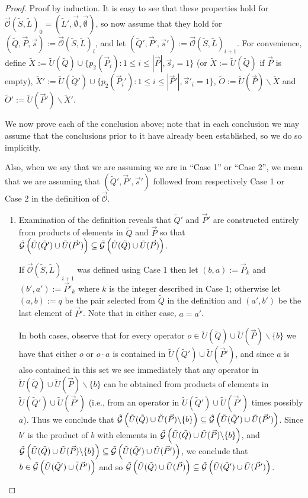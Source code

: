 \documentclass[twocolumn,showpacs,preprintnumbers,amsmath,amssymb,nofootinbib,pra,floatfix]{revtex4-1}
\newcommand{\lst}{\vec}
\newcommand{\set}{\tilde}
\newcommand{\genfun}{\tilde{\mathcal{G}}}
\newcommand{\unpack}{\set U}
\newcommand{\optimizer}{\lst{\mathcal{O}}}
\begin{document}
\begin{proof}
Proof by induction.  It is easy to see that these properties hold for $\optimizer(\set S,\set L)_0=(\set L',\lst\emptyset,\lst\emptyset)$, so now assume that they hold for $(\set Q,\lst P,\lst s):=\optimizer(\set S,\set L)_i$, and let $(\set Q',\lst P',\lst s'):=\optimizer(\set S,\set L)_{i+1}$.  For convenience, define $\set X:=\unpack(\set Q)\cup\{p_2(\lst P_i):1 \le i \le |\lst P|, \lst s_i=1\}$ (or $\set X:=\unpack(\set Q)$ if $\lst P$ is empty), $\set X':=\unpack(\set Q')\cup\{p_2(\lst P_i'):1 \le i \le |\lst P'|, \lst s'_i=1\}$, $\set O:=\unpack(\lst P)\backslash\set X$ and $\set O':=\unpack(\lst P')\backslash\set X'$.

We now prove each of the conclusion above;  note that in each conclusion we may assume that the conclusions prior to it have already been established, so we do so implicitly.

Also, when we say that we are assuming we are in ``Case 1'' or ``Case 2'', we mean that we are assuming that $(\set Q',\lst P',\lst s')$ followed from respectively Case 1 or Case 2 in the definition of $\optimizer$.

\begin{enumerate}
\item

Examination of the definition reveals that $\set Q'$ and $\lst P'$ are constructed entirely from products of elements in $\set Q$ and $\lst P$ so that $\genfun\paren{\set U(\set Q')\cup\set U(\lst P')}\subseteq\genfun\paren{\set U(\set Q)\cup\set U(\lst P)}$.

If $\optimizer(\set S,\set L)_{i+1}$ was defined using Case 1 then let $(b,a):=\lst P_k$ and $(b',a'):=\lst P'_k$ where $k$ is the integer described in Case 1;  otherwise let $(a,b):=q$ be the pair selected from $\set Q$ in the definition and $(a',b')$ be the last element of $\lst P'$.  Note that in either case, $a=a'$.

In both cases, observe that for every operator $o\in\set U(\set Q)\cup\set U(\lst P)\backslash\{b\}$ we have that either $o$ or $o\cdot a$ is contained in $\set U(\set Q')\cup\set U(\lst P')$, and since $a$ is also contained in this set we see immediately that any operator in $\set U(\set Q)\cup\set U(\lst P)\backslash\{b\}$ can be obtained from products of elements in $\set U(\set Q')\cup\set U(\lst P')$ (i.e., from an operator in $\set U(\set Q')\cup\set U(\lst P')$ times possibly $a$).  Thus we conclude that $\genfun\paren{\set U(\set Q)\cup\set U(\lst P)\backslash\{b\}}\subseteq\genfun\paren{\set U(\set Q')\cup\set U(\lst P')}$.  Since $b'$ is the product of $b$ with elements in $\genfun\paren{\set U(\set Q)\cup\set U(\lst P)\backslash\{b\}}$, and $\genfun\paren{\set U(\set Q)\cup\set U(\lst P)\backslash\{b\}}\subseteq\genfun\paren{\set U(\set Q')\cup\set U(\lst P')}$, we conclude that $b\in\genfun\paren{\set U(\set Q')\cup\set(\lst P')}$ and so $\genfun\paren{\set U(\set Q)\cup\set U(\lst P)}\subseteq\genfun\paren{\set U(\set Q')\cup\set U(\lst P')}$.


\end{enumerate}
\end{proof}
\end{document}
